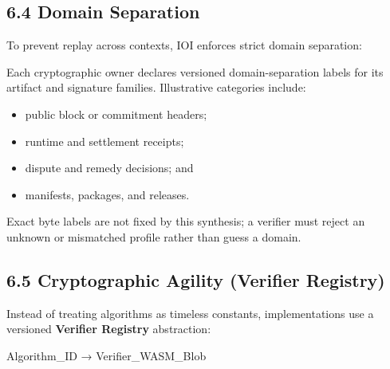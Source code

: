 \documentclass[
  11pt,
]{article}
\providecommand{\tightlist}{%
  \setlength{\itemsep}{0pt}\setlength{\parskip}{0pt}}
\begin{document}
\hypertarget{domain-separation}{%
\subsection{6.4 Domain Separation}\label{domain-separation}}

To prevent replay across contexts, IOI enforces strict domain
separation:


\begin{center}
\end{center}


Each cryptographic owner declares versioned domain-separation labels for its
artifact and signature families. Illustrative categories include:

\begin{itemize}
\tightlist
\item
  public block or commitment headers;
\item
  runtime and settlement receipts;
\item
  dispute and remedy decisions; and
\item
  manifests, packages, and releases.
\end{itemize}

Exact byte labels are not fixed by this synthesis; a verifier must reject an
unknown or mismatched profile rather than guess a domain.

\hypertarget{cryptographic-agility-verifier-registry}{%
\subsection{6.5 Cryptographic Agility (Verifier
Registry)}\label{cryptographic-agility-verifier-registry}}

Instead of treating algorithms as timeless constants, implementations use a
versioned \textbf{Verifier Registry} abstraction:

Algorithm\_ID → Verifier\_WASM\_Blob
\end{document}
